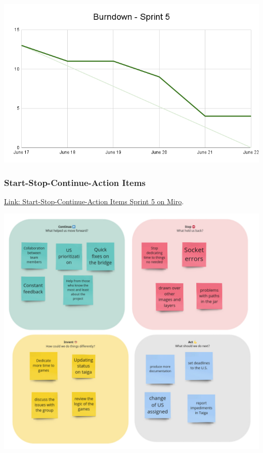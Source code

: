 \includegraphics[width=\textwidth]{./artifacts/src/sprint-5/assets/Burndown-Sprint5.png}

\hypertarget{startstopcontinueactionitems-s3}{
\subsubsection{Start-Stop-Continue-Action Items}\label{Start-Stop-Continue-Action Items S6}}
\href{https://miro.com/app/board/uXjVKDO7l8M=/?moveToWidget=3458764590247999187&cot=14}{Link: Start-Stop-Continue-Action Items Sprint 5 on Miro}.

\includegraphics[width=\textwidth]{./artifacts/src/sprint-5/assets/Retrospectives-Sprint5.png}
